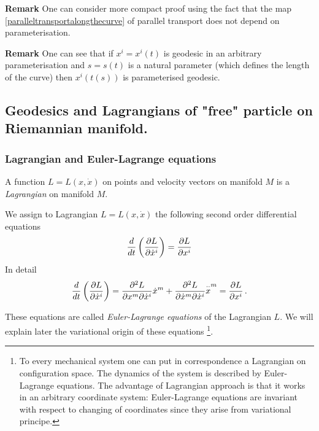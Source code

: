 \documentclass[12pt]{article}
\theoremstyle{theorem}
\numberwithin{equation}{section}
\begin{document}
{\m

{\bf Remark} One can consider more compact proof using the fact that the map \eqref{paralleltransportalongthecurve}
of parallel transport does not depend on parameterisation.

\m

{\bf Remark} One can see that if $x^i=x^i(t)$ is geodesic in an arbitrary parameterisation and
$s=s(t)$ is a natural parameter (which defines the length of the curve) then
$x^i(t(s))$ is parameterised geodesic.



   \subsection {Geodesics and Lagrangians of "free" particle on Riemannian manifold.}



     \subsubsection {Lagrangian and Euler-Lagrange equations}

   A function $L=L(x,\dot x)$ on points and velocity vectors on manifold $M$
   is a {\it Lagrangian} on manifold $M$.


   We assign  to  Lagrangian $L=L(x,\dot x)$ the following second order differential equations
\begin{equation}\label{ELequations1}
    {d\over dt}\left({\partial L\over \partial \dot x^i}\right)={\partial L\over \partial  x^i}
\end{equation}
In detail
\begin{equation}\label{ELequationsindetail}
    {d\over dt}\left({\p L\over \p \dot x^i}\right)={\p^2 L\over \p x^m \p \dot x^i}\dot x^m+
    {\p^2 L\over \p \dot x^m \p \dot x^i}{\buildrel \cdot\cdot\over x^m}
    =
    {\p L\over \p  x^i}\,.
\end{equation}

  These equations are called {\it Euler-Lagrange equations} of the Lagrangian $L$.
  We will explain later the variational origin of these equations
  \footnote{To every mechanical system one can put in correspondence  a Lagrangian on configuration space.
      The dynamics of the system is described by Euler-Lagrange equations.
      The advantage of Lagrangian approach is that it works in an arbitrary coordinate system:
      Euler-Lagrange equations are invariant
      with respect to changing of coordinates since they arise from variational principe.}.

}
\end{document}
